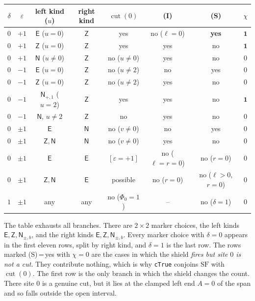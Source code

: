\documentclass[11pt]{article}
\theoremstyle{plain}
\theoremstyle{definition}
\theoremstyle{remark}
\begin{document}
\begin{center}
\small
\begin{tabular}{c|c|c|c|c|c|c|c}
$\delta$&$\varepsilon$&left kind ($u$)&right kind&$\operatorname{cut}(0)$&(I)&(S)&$\chi$\\\hline
$0$&$+1$&$\mathsf E$ ($u=0$)&$\mathsf Z$&yes&no ($\ell=0$)&\textbf{yes}&$\mathbf 1$\\
$0$&$+1$&$\mathsf Z$ ($u=0$)&$\mathsf Z$&yes&yes&no&$\mathbf 1$\\
$0$&$+1$&$\mathsf N$ ($u\ne0$)&$\mathsf Z$&no ($u\ne0$)&yes&no&$0$\\
$0$&$-1$&$\mathsf E$ ($u=0$)&$\mathsf Z$&no ($u\ne2$)&no&yes&$0$\\
$0$&$-1$&$\mathsf Z$ ($u=0$)&$\mathsf Z$&no ($u\ne2$)&yes&no&$0$\\
$0$&$-1$&$\mathsf N_{+,1}$ ($u=2$)&$\mathsf Z$&yes&yes&no&$\mathbf 1$\\
$0$&$-1$&$\mathsf N$, $u\ne2$&$\mathsf Z$&no&yes&no&$0$\\\hline
$0$&$\pm1$&$\mathsf E$&$\mathsf N$&no ($v\ne0$)&no&yes&$0$\\
$0$&$\pm1$&$\mathsf Z,\mathsf N$&$\mathsf N$&no ($v\ne0$)&yes&no&$0$\\
$0$&$\pm1$&$\mathsf E$&$\mathsf E$&$[\varepsilon=+1]$&no ($\ell=r=0$)&no ($r=0$)&$0$\\
$0$&$\pm1$&$\mathsf Z,\mathsf N$&$\mathsf E$&possible&no ($r=0$)&no ($\ell>0$, $r=0$)&$0$\\\hline
$1$&$\pm1$&any&any&no ($\Phi_0=1$)&--&no ($\delta=1$)&$0$
\end{tabular}
\end{center}

The table exhausts all branches. There are $2\times2$ marker choices, the left kinds
$\mathsf E,\mathsf Z,\mathsf N_{\pm,b}$, and the right kinds $\mathsf E,\mathsf Z,\mathsf N_{\pm,b}$.
Every marker choice with $\delta=0$ appears in the first eleven rows, split by right kind, and
$\delta=1$ is the last row. The rows marked (S)\,=\,yes with $\chi=0$ are the cases in which
the shield \emph{fires but site $0$ is not a cut}. They contribute nothing, which is why
\texttt{cTrue} conjoins $\mathrm{SF}$ with $\operatorname{cut}(0)$. The first row is the only
branch in which the shield changes the count. There site $0$ is a genuine cut, but it lies
at the clamped left end $A=0$ of the span and so falls outside the open interval.
\end{document}
